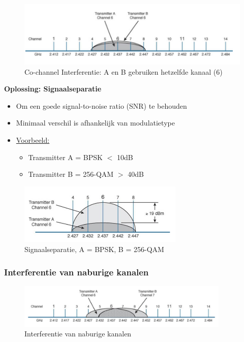 \documentclass{article}
\newcommand{\bold}[1]{\textbf{#1}}
\begin{document}
\begin{figure}[H]
    \centering
    \includegraphics[width=\textwidth]{Screenshot_20200309_115759.png}
    \caption{Co-channel Interferentie: A en B gebruiken hetzelfde kanaal (6)}
\end{figure}

\bold{Oplossing: Signaalseparatie}

\begin{itemize}
    \item Om een goede signal-to-noise ratio (SNR) te behouden 
    \item Minimaal verschil is afhankelijk van modulatietype
    \item \underline{Voorbeeld:}
    \begin{itemize}
        \item Transmitter A = BPSK $<$ 10dB
        \item Transmitter B = 256-QAM $>$ 40dB
    \end{itemize}
\end{itemize}

\begin{figure}[H]
    \centering
    \includegraphics[width=0.7\textwidth]{Screenshot_20200309_120012.png}
    \caption{Signaalseparatie, A = BPSK, B = 256-QAM}
\end{figure}

\subsubsection{Interferentie van naburige kanalen}
\begin{figure}[H]
    \centering
    \includegraphics[width=0.9\textwidth]{Screenshot_20200309_120313.png}
    \caption{Interferentie van naburige kanalen}
\end{figure}
\end{document}
